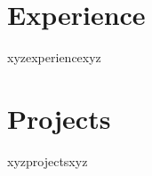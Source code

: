 \documentclass[a4paper,10pt]{article}
\begin{document}
\vspace{-10pt}
\section*{Experience}
\vspace{-3pt}
xyzexperiencexyz
\vspace{-10pt}
\section*{Projects}
\vspace{-3pt}
xyzprojectsxyz
\end{document}
